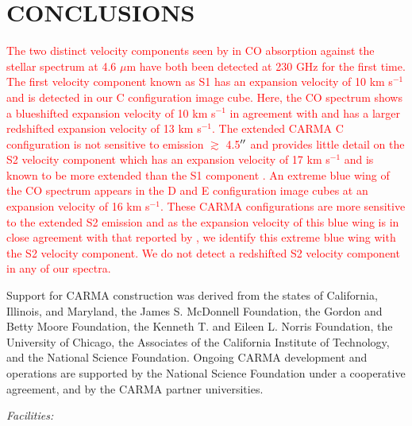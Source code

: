 \documentclass[preprint2]{aastex}
\begin{document}
\section{CONCLUSIONS}
\textcolor{red}{
The two distinct velocity components seen by \cite{1979ApJ...233L.135B} in CO absorption against the stellar spectrum at 4.6 $\mu$m have both been detected at 230 GHz for the first time. The first velocity component known as S1 has an expansion velocity of 10 km s${}^{-1}$ \citep{1979ApJ...233L.135B} and is detected in our C configuration image cube. Here, the CO spectrum shows a blueshifted expansion velocity of 10 km s${}^{-1}$ in agreement with \cite{1979ApJ...233L.135B} and has a larger redshifted expansion velocity of 13 km s${}^{-1}$. The extended CARMA C configuration is not sensitive to emission $\gtrsim$ 4.5$\mbox{$^{\prime\prime}$}$ and provides little detail on the S2 velocity component which has an expansion velocity of 17 km s${}^{-1}$ \citep{1979ApJ...233L.135B} and is known to be more extended than the S1 component \citep{1979ApJ...233L.135B, 1987ApJ...313..400H}. An extreme blue wing of the CO spectrum appears in the D and E configuration image cubes at an expansion velocity of 16 km s${}^{-1}$. These CARMA configurations are more sensitive to the extended S2 emission and as the expansion velocity of this blue wing is in close agreement with that reported by \cite{1979ApJ...233L.135B}, we identify this extreme blue wing with the S2 velocity component. We do not detect a redshifted S2 velocity component in any of our spectra. }

\acknowledgments

Support for CARMA construction was derived from the states of California, Illinois, and
Maryland, the James S. McDonnell Foundation, the Gordon and Betty Moore Foundation, the
Kenneth T. and Eileen L. Norris Foundation, the University of Chicago, the Associates of the
California Institute of Technology, and the National Science Foundation. Ongoing CARMA
development and operations are supported by the National Science Foundation under a
cooperative agreement, and by the CARMA partner universities.

{\it Facilities:} 


\end{document}
